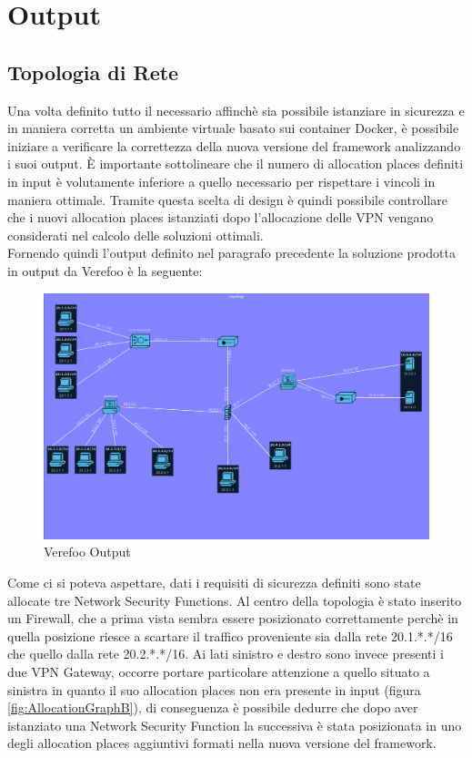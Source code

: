 \section{Output}
\subsection{Topologia di Rete}
Una volta definito tutto il necessario affinchè sia possibile istanziare in sicurezza e in maniera corretta un ambiente virtuale basato sui container Docker, è possibile iniziare a verificare la correttezza della nuova versione del framework analizzando i suoi output.
È importante sottolineare che il numero di allocation places definiti in input è volutamente inferiore a quello necessario per rispettare i vincoli in maniera ottimale. Tramite questa scelta di design è quindi possibile controllare che i nuovi allocation places istanziati dopo 
l'allocazione delle VPN vengano considerati nel calcolo delle soluzioni ottimali.\\
Fornendo quindi l'output definito nel paragrafo precedente la soluzione prodotta in output da Verefoo è la seguente:

\begin{figure}[h]  %
    \centering
    \includegraphics[width=1\textwidth]{Topologia_finale.png} 
    \caption{Verefoo Output}
    \label{fig:VPNDeploy}
\end{figure}

Come ci si poteva aspettare, dati i requisiti di sicurezza definiti sono state allocate tre Network Security Functions. Al centro della topologia è stato inserito un Firewall, che a prima vista sembra essere posizionato correttamente perchè in quella posizione riesce a scartare il traffico proveniente sia dalla
rete 20.1.*.*/16 che quello dalla rete 20.2.*.*/16. Ai lati sinistro e destro sono invece presenti i due VPN Gateway, occorre portare particolare attenzione a quello situato a sinistra in quanto il suo allocation places non era presente in input (figura \ref{fig:AllocationGraphB}), di conseguenza è possibile dedurre che dopo aver
istanziato una Network Security Function la successiva è stata posizionata in uno degli allocation places aggiuntivi formati nella nuova versione del framework.

